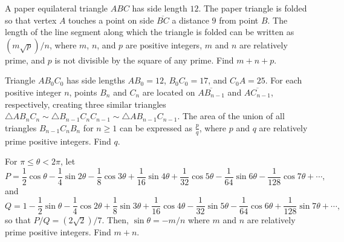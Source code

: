 \documentclass[11pt]{article}
\theoremstyle{definition}
\begin{document}
\begin{question}[name={2013 AIME I, \href{https://artofproblemsolving.com/community/c4p2969819}{Problem 9}}]
	A paper equilateral triangle $ABC$ has side length $12$. The paper triangle is folded so that vertex $A$ touches a point on side $\overline{BC}$ a distance $9$ from point $B$. The length of the line segment along which the triangle is folded can be written as $(m\sqrt{p})/{n}$, where $m$, $n$, and $p$ are positive integers, $m$ and $n$ are relatively prime, and $p$ is not divisible by the square of any prime. Find $m+n+p$.
\end{question}


%	













\begin{question}[name={2013 AIME I, \href{https://artofproblemsolving.com/community/c4p2969816}{Problem 13}}]
	Triangle $AB_0C_0$ has side lengths $AB_0 = 12$, $B_0C_0 = 17$, and $C_0A = 25$. For each positive integer $n$, points $B_n$ and $C_n$ are located on $\overline{AB_{n-1}}$ and $\overline{AC_{n-1}}$, respectively, creating three similar triangles $\triangle AB_nC_n \sim \triangle B_{n-1}C_nC_{n-1} \sim \triangle AB_{n-1}C_{n-1}$. The area of the union of all triangles $B_{n-1}C_nB_n$ for $n\geq1$ can be expressed as $\tfrac pq$, where $p$ and $q$ are relatively prime positive integers. Find $q$.	
\end{question}


%	













\begin{question}[name={2013 AIME I, \href{https://artofproblemsolving.com/community/c4p2969813}{Problem 14}}]
	For $\pi\leq\theta<2\pi$, let
	\[ P=\dfrac12\cos\theta-\dfrac14\sin2\theta-\dfrac18\cos3\theta+\dfrac1{16}\sin4\theta+\dfrac1{32}\cos5\theta-\dfrac1{64}\sin6\theta-\dfrac1{128}\cos7\theta+\cdots,
	\]and
	\[ Q=1-\dfrac12\sin\theta-\dfrac14\cos2\theta+\dfrac1{8}\sin3\theta+\dfrac1{16}\cos4\theta-\dfrac1{32}\sin5\theta-\dfrac1{64}\cos6\theta+\dfrac1{128}\sin7\theta
	+\cdots, \]so that $ P/Q = (2\sqrt2)/7$. Then, $\sin\theta = - m/n$ where $m$ and $n$ are relatively prime positive integers. Find $m+n$.
\end{question}
\end{document}
